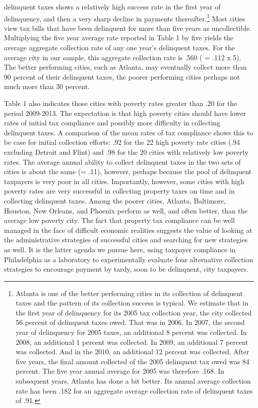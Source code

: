 \documentclass[12pt,titlepage]{article}
\begin{document}
delinquent taxes shows a relatively high success rate in the first
year of delinquency, and then a very sharp decline in payments
thereafter.\footnote{Atlanta is one of the better performing cities in
  its collection of delinquent taxes and the pattern of its collection
  success is typical.  We estimate that in the first year of
  delinquency for its 2005 tax collection year, the city collected 56
  percent of delinquent taxes owed. That was in 2006.  In 2007, the
  second year of delinquency for 2005 taxes, an additional 8 percent
  was collected.  In 2008, an additional 1 percent was collected.  In
  2009, an additional 7 percent was collected.  And in the 2010, an
  additional 12 percent was collected.  After five years, the final
  amount collected of the 2005 delinquent tax owed was 84 percent.
  The five year annual average for 2005 was therefore .168.  In
  subsequent years, Atlanta has done a bit better.  Its annual average
  collection rate has been .182 for an aggregate average collection
  rate of delinquent taxes of .91.} Most cities view tax bills that
have been delinquent for more than five years as uncollectible.
Multiplying the five year average rate reported in Table 1 by five
yields the average aggregate collection rate of any one year's
delinquent taxes.  For the average city in our sample, this aggregate
collection rate is .560 ( = .112 x 5).  The better performing cities,
such as Atlanta, may eventually collect more than 90 percent of their
delinquent taxes, the poorer performing cities perhaps not much more
than 30 percent.

Table 1 also indicates those cities with poverty rates greater than
.20 for the period 2009-2013.  The expectation is that high poverty
cities should have lower rates of initial tax compliance and possibly
more difficulty in collecting delinquent taxes.  A comparison of the
mean rates of tax compliance shows this to be case for initial
collection efforts: .92 for the 22 high poverty rate cities (.94
excluding Detroit and Flint) and .98 for the 20 cities with relatively
low poverty rates.  The average annual ability to collect delinquent
taxes in the two sets of cities is about the same (= .11), however,
perhaps because the pool of delinquent taxpayers is very poor in all
cities.  Importantly, however, some cities with high poverty rates are
very successful in collecting property taxes on time and in collecting
delinquent taxes.  Among the poorer cities, Atlanta, Baltimore,
Houston, New Orleans, and Phoenix perform as well, and often better,
than the average low poverty city.  The fact that property tax
compliance can be well managed in the face of difficult economic
realities suggests the value of looking at the administrative
strategies of successful cities and searching for new strategies as
well.  It is the latter agenda we pursue here, using taxpayer
compliance in Philadelphia as a laboratory to experimentally evaluate
four alternative collection strategies to encourage payment by tardy,
soon to be delinquent, city taxpayers.
\end{document}
